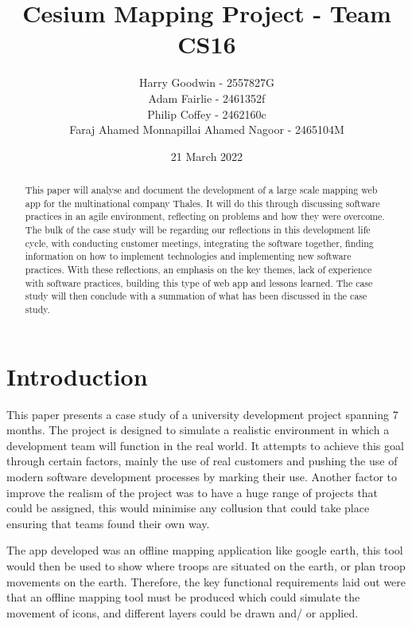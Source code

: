 \documentclass{l3proj}
\begin{document}
\title{Cesium Mapping Project - Team CS16}

\author{Harry Goodwin - 2557827G \\
        Adam Fairlie - 2461352f\\
        Philip Coffey - 2462160c\\
        Faraj Ahamed Monnapillai Ahamed Nagoor - 2465104M}

\date{21 March 2022}

\maketitle

\begin{abstract}
This paper will analyse and document the development of a large scale mapping web app for the multinational company Thales.  It will do this through discussing software practices in an agile environment, reflecting on problems and how they were overcome.  The bulk of the case study will be regarding our reflections in this development life cycle, with conducting customer meetings, integrating the software together, finding information on how to implement technologies and implementing new software practices.  With these reflections, an emphasis on the key themes, lack of experience with software practices, building this type of web app and lessons learned.  The case study will then conclude with a summation of what has been discussed in the case study.


\end{abstract}

\educationalconsent

\newpage

\section{Introduction}
\setlength{\parindent}{20pt}

This paper presents a case study of a university development project spanning 7 months.  The project is designed to simulate a realistic environment in which a development team will function in the real world.  It attempts to achieve this goal through certain factors, mainly the use of real customers and pushing the use of modern software development processes by marking their use.  Another factor to improve the realism of the project was to have a huge range of projects that could be assigned, this would minimise any collusion that could take place ensuring that teams found their own way. \par
The app developed was an offline mapping application like google earth, this tool would then be used to show where troops are situated on the earth, or plan troop movements on the earth.  Therefore, the key functional requirements laid out were that an offline mapping tool must be produced which could simulate the movement of icons, and different layers could be drawn and/ or applied. \par
\end{document}
